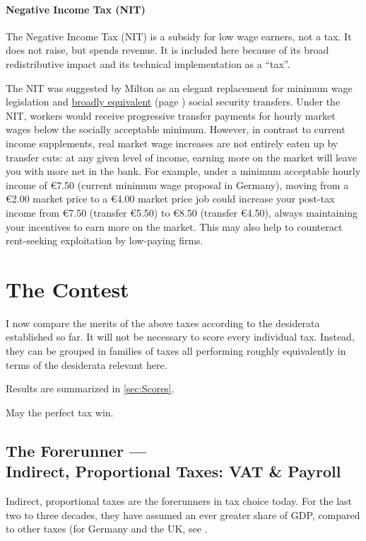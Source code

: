 \paragraph{Negative Income Tax (NIT)}  \label{sec:NIT} The Negative Income Tax (NIT) is a subsidy for low wage earners, not a tax.
It does not raise, but spends revenue.
It is included here because of its broad redistributive impact and its technical implementation as a ``tax''.

The NIT was suggested by Milton \cite{Friedman1962} as an elegant replacement for minimum wage legislation and \hyperref[sec:StructuralUnemployment]{broadly equivalent} (page \pageref{sec:StructuralUnemployment}) social security transfers.
Under the NIT, workers would receive progressive transfer payments for hourly market wages below the socially acceptable minimum.
However, in contrast to current income supplements, real market wage increases are not entirely eaten up by transfer cuts:
at any given level of income, earning more on the market will leave you with more net in the bank.
For example, under a minimum acceptable hourly income of \euro{}7.50 (current minimum wage proposal in Germany), moving from a \euro{}2.00 market price to a \euro{}4.00 market price job could increase your post-tax income from \euro{}7.50 (transfer \euro{}5.50) to \euro{}8.50 (transfer \euro{}4.50), always maintaining your incentives to earn more on the market.
This may also help to counteract rent-seeking exploitation by low-paying firms.

\section{The Contest} \label{sec:contest} I now compare the merits of the above taxes according to the desiderata established so far.
It will not be necessary to score every individual tax.
Instead, they can be grouped in families of taxes all performing roughly equivalently in terms of the desiderata relevant here.

Results are summarized in \autoref{sec:Scores}.

May the perfect tax win.

\subsection[Indirect, Proportional Taxes]{The Forerunner ---\\Indirect, Proportional Taxes:
VAT \& Payroll} \label{sec:ScoreVAT} Indirect, proportional taxes are the forerunners in tax choice today.
For the last two to three decades, they have assumed an ever greater share of GDP, compared to other taxes (for Germany and the UK, see \citep[11]{Kemmerling2009}.

